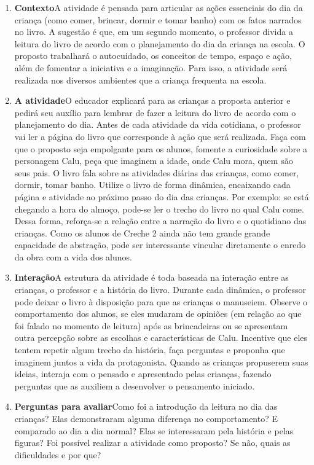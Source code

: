 \documentclass[11pt]{extarticle}
\begin{document}
\begin{enumerate}
\item \textbf{Contexto}\quad A atividade é pensada para articular as ações essenciais do dia da criança (como comer, brincar, dormir e tomar banho) com os fatos narrados no livro. A sugestão é que, em um segundo momento, o professor divida a leitura do livro de acordo com o planejamento do dia da criança na escola. O proposto trabalhará o autocuidado, os conceitos de tempo, espaço e ação, além de fomentar a iniciativa e a imaginação. 
Para isso, a atividade será realizada nos diversos ambientes que a criança frequenta na escola. 

\item \textbf{A atividade}\quad O educador explicará para as crianças a proposta anterior e pedirá seu auxílio para lembrar de fazer a leitura do livro de acordo com o planejamento do dia. Antes de cada atividade da vida cotidiana, o professor vai ler a página do livro que corresponde à ação que será realizada. Faça com que o proposto seja empolgante para os alunos, fomente a curiosidade sobre a personagem Calu, peça que imaginem a idade, onde Calu mora, quem são seus pais. 
O livro fala sobre as atividades diárias das crianças, como comer, dormir, tomar banho. Utilize o livro de forma dinâmica, encaixando cada página e atividade ao próximo passo do dia das crianças. Por exemplo: se está chegando a hora do almoço, pode-se ler o trecho do livro no qual Calu come.
Dessa forma, reforça-se a relação entre a narração do livro e o quotidiano das crianças. Como os alunos de Creche 2 ainda não tem grande grande capacidade de abstração, pode ser interessante vincular diretamente o enredo da obra com a vida dos alunos.

\item \textbf{Interação}\quad A estrutura da atividade é toda baseada na interação entre as crianças, o professor e a história do livro. Durante cada dinâmica, o professor pode deixar o livro à disposição para que as crianças o manuseiem. Observe o comportamento dos alunos, se eles mudaram de opiniões (em relação ao que foi falado no momento de leitura) após as brincadeiras ou se apresentam outra percepção sobre as escolhas e características de Calu. Incentive que eles tentem repetir algum trecho da história,
faça perguntas e proponha que imaginem juntos a vida da protagonista. Quando as crianças propuserem suas ideias, interaja com o pensado e apresentado pelas crianças, fazendo perguntas que as auxiliem a desenvolver o pensamento iniciado.

\item \textbf{Perguntas para avaliar}\quad Como foi a introdução da leitura no dia das crianças? Elas demonstraram alguma diferença no comportamento? E comparado ao dia a dia normal? Elas se interessaram pela história e pelas figuras? Foi possível realizar a atividade como proposto? Se não, quais as dificuldades e por que? 
\end{enumerate}
\end{document}
